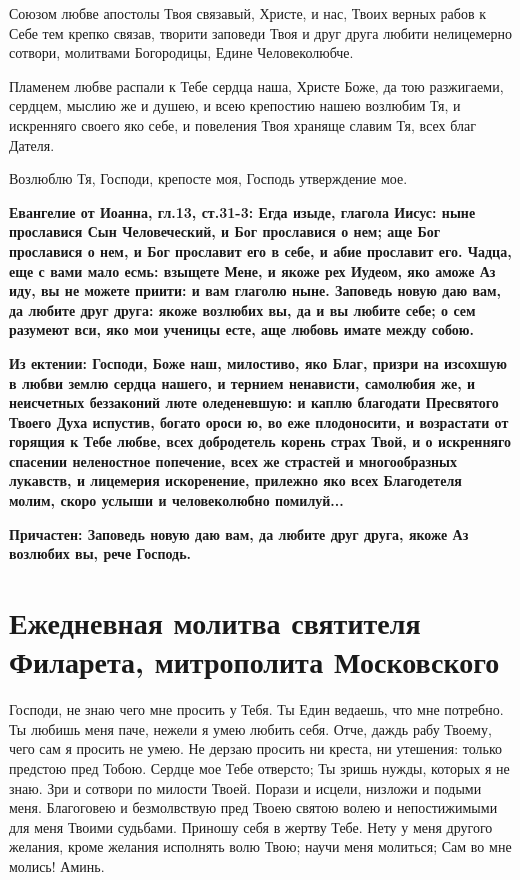 

Союзом любве апостолы Твоя связавый, Христе, и нас, Твоих верных рабов к Себе тем крепко связав, творити заповеди Твоя и друг друга любити нелицемерно сотвори, молитвами Богородицы, Едине Человеколюбче.




Пламенем любве распали к Тебе сердца наша, Христе Боже, да тою разжигаеми, сердцем, мыслию же и душею, и всею крепостию нашею возлюбим Тя, и искренняго своего яко себе, и повеления Твоя храняще славим Тя, всех благ Дателя.




Возлюблю Тя, Господи, крепосте моя, Господь утверждение мое.


\bfseries Евангелие от Иоанна, гл.13, ст.31-3:\normalfont{} Егда изыде, глагола Иисус: ныне прославися Сын Человеческий, и Бог прославися о нем; аще Бог прославися о нем, и Бог прославит его в себе, и абие прославит его. Чадца, еще с вами мало есмь: взыщете Мене, и якоже рех Иудеом, яко аможе Аз иду, вы не можете приити: и вам глаголю ныне. Заповедь новую даю вам, да любите друг друга: якоже возлюбих вы, да и вы любите себе; о сем разумеют вси, яко мои ученицы есте, аще любовь имате между собою.


\bfseries Из ектении:\normalfont{} Господи, Боже наш, милостиво, яко Благ, призри на изсохшую в любви землю сердца нашего, и тернием ненависти, самолюбия же, и неисчетных беззаконий люте оледеневшую: и каплю благодати Пресвятого Твоего Духа испустив, богато ороси ю, во еже плодоносити, и возрастати от горящия к Тебе любве, всех добродетель корень страх Твой, и о искренняго спасении неленостное попечение, всех же страстей и многообразных лукавств, и лицемерия искоренение, прилежно яко всех Благодетеля молим, скоро услыши и человеколюбно помилуй...


\bfseries Причастен:\normalfont{} Заповедь новую даю вам, да любите друг друга, якоже Аз возлюбих вы, рече Господь.


\section{Ежедневная молитва святителя Филарета, митрополита Московского}
 


Господи, не знаю чего мне просить у Тебя. Ты Един ведаешь, что мне потребно. Ты любишь меня паче, нежели я умею любить себя. Отче, даждь рабу Твоему, чего сам я просить не умею. Не дерзаю просить ни креста, ни утешения: только предстою пред Тобою. Сердце мое Тебе отверсто; Ты зришь нужды, которых я не знаю. Зри и сотвори по милости Твоей. Порази и исцели, низложи и подыми меня. Благоговею и безмолвствую пред Твоею святою волею и непостижимыми для меня Твоими судьбами. Приношу себя в жертву Тебе. Нету у меня другого желания, кроме желания исполнять волю Твою; научи меня молиться; Сам во мне молись! Аминь. 


